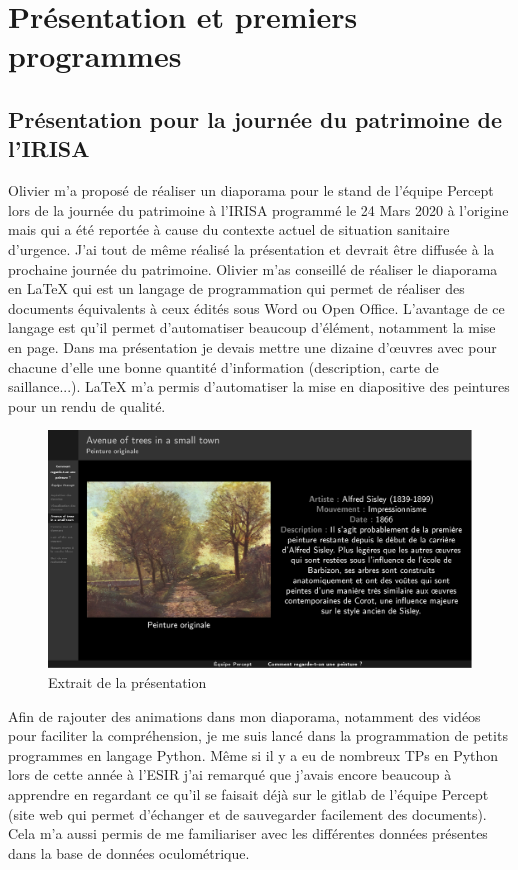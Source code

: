 \chapter{Présentation et premiers programmes}

\section{Présentation pour la journée du patrimoine de l'IRISA}

\par
Olivier m'a proposé de réaliser un diaporama pour le stand de l'équipe Percept lors de la journée du patrimoine à l'IRISA programmé le 24 Mars 2020 à l'origine mais qui a été reportée à cause du contexte actuel de situation sanitaire d'urgence. J'ai tout de même réalisé la présentation et devrait être diffusée à la prochaine journée du patrimoine. Olivier m'as conseillé de réaliser le diaporama en \LaTeX{} qui est un langage de programmation qui permet de réaliser des documents équivalents à ceux édités sous Word ou Open Office. L'avantage de ce langage est qu'il permet d'automatiser beaucoup d'élément, notamment la mise en page. Dans ma présentation je devais mettre une dizaine d'\oe{}uvres avec pour chacune d'elle une bonne quantité d'information (description, carte de saillance...). \LaTeX{} m'a permis d'automatiser la mise en diapositive des peintures pour un rendu de qualité.

\begin{figure}[!ht]
    \centering
    \includegraphics[width=0.7\linewidth]{datas/exemple_diapo.png}
    \caption{Extrait de la présentation}
    \label{ex_diapo}
\end{figure}

\par
Afin de rajouter des animations dans mon diaporama, notamment des vidéos pour faciliter la compréhension, je me suis lancé dans la programmation de petits programmes en langage Python. Même si il y a eu de nombreux TPs en Python lors de cette année à l'ESIR j'ai remarqué que j'avais encore beaucoup à apprendre en regardant ce qu'il se faisait déjà sur le gitlab de l'équipe Percept (site web qui permet d'échanger et de sauvegarder facilement des documents). Cela m'a aussi permis de me familiariser avec les différentes données présentes dans la base de données oculométrique.

